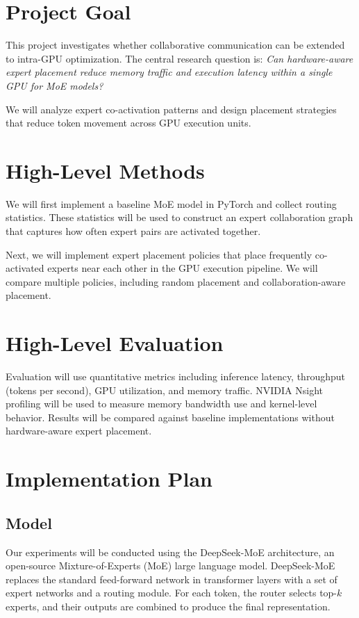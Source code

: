 \documentclass{article} %
\begin{document}
\section{Project Goal}
This project investigates whether collaborative communication can be extended to intra-GPU optimization. The central research question is: \emph{Can hardware-aware expert placement reduce memory traffic and execution latency within a single GPU for MoE models?}

We will analyze expert co-activation patterns and design placement strategies that reduce token movement across GPU execution units.

\section{High-Level Methods}
We will first implement a baseline MoE model in PyTorch and collect routing statistics. These statistics will be used to construct an expert collaboration graph that captures how often expert pairs are activated together.

Next, we will implement expert placement policies that place frequently co-activated experts near each other in the GPU execution pipeline. We will compare multiple policies, including random placement and collaboration-aware placement.

\section{High-Level Evaluation}
Evaluation will use quantitative metrics including inference latency, throughput (tokens per second), GPU utilization, and memory traffic. NVIDIA Nsight profiling will be used to measure memory bandwidth use and kernel-level behavior. Results will be compared against baseline implementations without hardware-aware expert placement.

\section{Implementation Plan}
\subsection{Model}
Our experiments will be conducted using the DeepSeek-MoE architecture, an open-source Mixture-of-Experts (MoE) large language model. DeepSeek-MoE replaces the standard feed-forward network in transformer layers with a set of expert networks and a routing module. For each token, the router selects top-$k$ experts, and their outputs are combined to produce the final representation.
\end{document}
